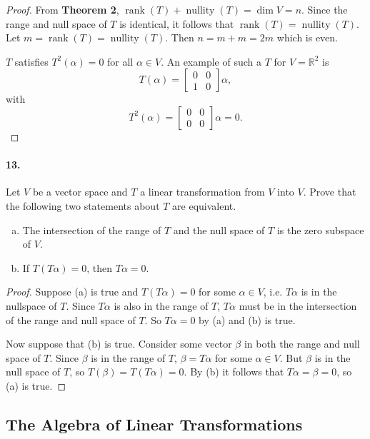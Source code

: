\documentclass{article}
\DeclareMathOperator{\rank}{rank}
\DeclareMathOperator{\nullity}{nullity}
\begin{document}
\begin{proof}
  From \textbf{Theorem 2}, $\rank(T) + \nullity(T) = \dim V = n$. Since the
  range and null space of $T$ is identical, it follows that $\rank(T) =
  \nullity(T)$. Let $m = \rank(T) = \nullity(T)$. Then $n = m + m = 2m$ which is
  even.

  $T$ satisfies $T^2(\alpha) = 0$ for all $\alpha \in V$. An example of such a
  $T$ for $V
  = \mathbb{R}^2$ is \[
    T(\alpha) = \begin{bmatrix}
      0 & 0 \\
      1 & 0
    \end{bmatrix}\alpha,
  \] with \[
    T^2(\alpha) = \begin{bmatrix}
      0 & 0 \\
      0 & 0
    \end{bmatrix}\alpha = 0.
  \]
\end{proof}

\paragraph{13.} Let $V$ be a vector space and $T$ a linear transformation from
$V$ into $V$. Prove that the following two statements about $T$ are equivalent.
\begin{enumerate}[(a)]
  \item The intersection of the range of $T$ and the null space of $T$ is the
    zero subspace of $V$.
  \item If $T(T\alpha) = 0$, then $T\alpha = 0$.
\end{enumerate}

\begin{proof}
  Suppose (a) is true and $T(T\alpha) = 0$ for some $\alpha \in V$, i.e.
  $T\alpha$ is in the nullspace of $T$. Since $T\alpha$ is also in the range of
  $T$, $T\alpha$ must be in the intersection of the range and null space of $T$.
  So $T\alpha = 0$ by (a) and (b) is true.

  Now suppose that (b) is true. Consider some vector $\beta$ in both the range
  and null space of $T$. Since $\beta$ is in the range of $T$, $\beta = T\alpha$
  for some $\alpha \in V$. But $\beta$ is in the null space of $T$, so $T(\beta)
  = T(T\alpha) = 0$. By (b) it follows that $T\alpha = \beta = 0$, so (a) is
  true.
\end{proof}

\subsection{The Algebra of Linear Transformations}
\end{document}
